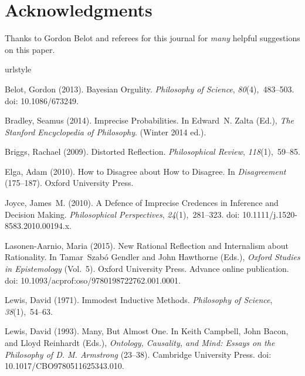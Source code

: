 \documentclass{ergoclass}
\begin{document}
\section*{Acknowledgments}
Thanks to Gordon Belot and referees for this journal for \textit{many} helpful suggestions on this paper.


\begin{thebibliography}{14}
\providecommand{\natexlab}[1]{#1}
\providecommand{\url}[1]{\texttt{#1}}
\expandafter\ifx\csname urlstyle\endcsname\relax
  \providecommand{\doi}[1]{doi: #1}\else
  \providecommand{\doi}{doi: \begingroup \urlstyle{rm}\Url}\fi

Belot, Gordon (2013).
\newblock Bayesian Orgulity.
\newblock \emph{Philosophy of Science}, \emph{80}(4),~483--503.
\newblock \doi{10.1086/673249}.

Bradley, Seamus (2014).
\newblock Imprecise Probabilities.
\newblock In Edward~N. Zalta (Ed.), \emph{The Stanford Encyclopedia of
  Philosophy}. (Winter 2014 ed.).

Briggs, Rachael (2009).
\newblock Distorted Reflection.
\newblock \emph{Philosophical Review}, \emph{118}(1),~59--85.

Elga, Adam (2010).
\newblock How to Disagree about How to Disagree.
\newblock In \emph{Disagreement} (175--187). Oxford University Press.

Joyce, James~M. (2010).
\newblock A Defence of Imprecise Credences in Inference and Decision Making.
\newblock \emph{Philosophical Perspectives}, \emph{24}(1),~281--323.
\newblock \doi{10.1111/j.1520-8583.2010.00194.x}.

Lasonen-Aarnio, Maria (2015).
\newblock New Rational Reflection and Internalism about Rationality.
\newblock In Tamar~Szab{\'o} Gendler and John Hawthorne (Eds.), \emph{Oxford
  Studies in Epistemology} (Vol.~5). Oxford University Press. 
\newblock Advance online publication.
\newblock \doi{10.1093/acprof:oso/9780198722762.001.0001}.

Lewis, David (1971).
\newblock Immodest Inductive Methods.
\newblock \emph{Philosophy of Science}, \emph{38}(1),~54--63.

Lewis, David (1993).
\newblock Many, But Almost One.
\newblock In Keith Campbell, John Bacon, and Lloyd Reinhardt (Eds.),
  \emph{Ontology, Causality, and Mind: Essays on the Philosophy of {D. M.
  Armstrong}} (23--38). Cambridge University Press.
\newblock \doi{10.1017/CBO9780511625343.010}.


\end{thebibliography}
\end{document}
